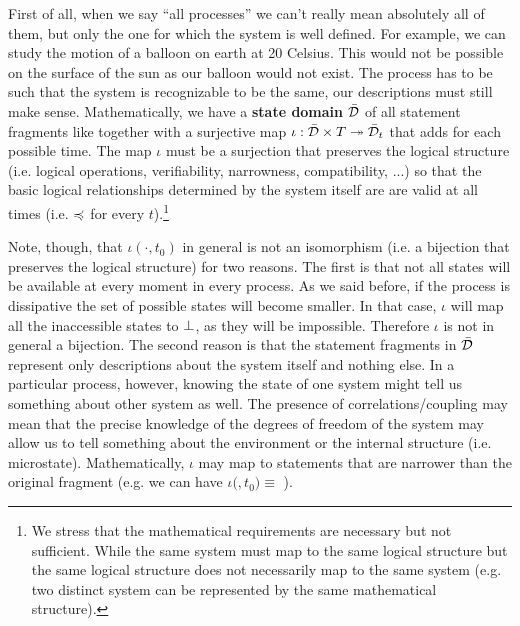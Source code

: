 \documentclass[letterpaper]{article}
\begin{document}
First of all, when we say ``all processes'' we can't really mean absolutely all of them, but only the one for which the system is well defined. For example, we can study the motion of a balloon on earth at 20 Celsius. This would not be possible on the surface of the sun as our balloon would not exist. The process has to be such that the system is recognizable to be the same, our descriptions must still make sense. Mathematically, we have a \textbf{state domain} $\bar{\mathcal{D}}$ of all statement fragments like  together with a surjective map $\iota : \bar{\mathcal{D}} \times T \twoheadrightarrow \bar{\mathcal{D}}_t$ that adds  for each possible time. The map $\iota$ must be a surjection that preserves the logical structure (i.e. logical operations, verifiability, narrowness, compatibility, ...) so that the basic logical relationships determined by the system itself are are valid at all times (i.e.  $\preccurlyeq$  for every $t$).\footnote{We stress that the mathematical requirements are necessary but not sufficient. While the same system must map to the same logical structure but the same logical structure does not necessarily map to the same system (e.g. two distinct system can be represented by the same mathematical structure).}

Note, though, that $\iota( \cdot, t_0)$ in general is not an isomorphism (i.e. a bijection that preserves the logical structure) for two reasons. The first is that not all states will be available at every moment in every process. As we said before, if the process is dissipative the set of possible states will become smaller. In that case, $\iota$ will map all the inaccessible states to $\bot$, as they will be impossible. Therefore $\iota$ is not in general a bijection. The second reason is that the statement fragments in $\bar{\mathcal{D}}$ represent only descriptions about the system itself and nothing else. In a particular process, however, knowing the state of one system might tell us something about other system as well. The presence of correlations/coupling may mean that the precise knowledge of the degrees of freedom of the system may allow us to tell something about the environment or the internal structure (i.e. microstate). Mathematically, $\iota$ may map to statements that are narrower than the original fragment (e.g. we can have $\iota($$, t_0) \equiv$ ).
\end{document}
